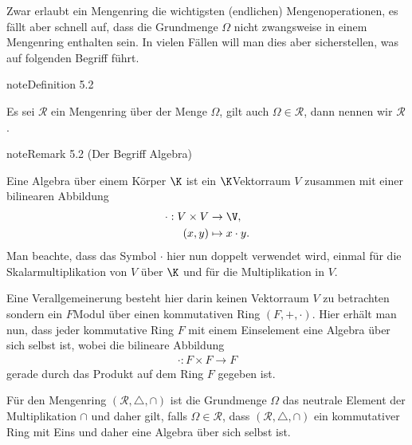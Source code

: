 \documentclass[letterpaper,10pt,german]{jupyterBook}
\begin{document}
\sphinxAtStartPar
Zwar erlaubt ein Mengenring die wichtigsten (endlichen) Mengenoperationen, es fällt aber schnell auf, dass die Grundmenge \(\Omega\) nicht zwangsweise in einem Mengenring enthalten sein. In vielen Fällen will man dies aber sicherstellen, was auf folgenden Begriff führt.
\label{masstheorie/masstheorie:definition-3}
\begin{sphinxadmonition}{note}{Definition 5.2}



\sphinxAtStartPar
Es sei \(\mathcal{R}\) ein Mengenring über der Menge \(\Omega\), gilt auch \(\Omega\in\mathcal{R}\), dann nennen wir \(\mathcal{R}\) .
\end{sphinxadmonition}
\label{masstheorie/masstheorie:remark-4}
\begin{sphinxadmonition}{note}{Remark 5.2 (Der Begriff Algebra)}



\sphinxAtStartPar
Eine Algebra über einem Körper \(\K\) ist ein \(\K\)\sphinxhyphen{}Vektorraum \(V\) zusammen mit einer bilinearen Abbildung
\begin{equation*}
\begin{split}\cdot:V\times V&\to \V,\\
(x,y)&\mapsto x\cdot y.\end{split}
\end{equation*}
\sphinxAtStartPar
Man beachte, dass das Symbol \(\cdot\) hier nun doppelt verwendet wird, einmal für die Skalarmultiplikation von \(V\) über \(\K\) und für die Multiplikation in \(V\).

\sphinxAtStartPar
Eine Verallgemeinerung besteht hier darin keinen Vektorraum \(V\) zu betrachten sondern ein \(F\)\sphinxhyphen{}Modul über einen kommutativen Ring \((F,+,\cdot)\). Hier erhält man nun, dass jeder kommutative Ring \(F\) mit einem Einselement eine Algebra über sich selbst ist, wobei die bilineare Abbildung
\begin{equation*}
\begin{split}\cdot:F\times F\to F\end{split}
\end{equation*}
\sphinxAtStartPar
gerade durch das Produkt auf dem Ring \(F\) gegeben ist.

\sphinxAtStartPar
Für den Mengenring \((\mathcal{R},\triangle, \cap)\) ist die Grundmenge \(\Omega\) das neutrale Element der Multiplikation \(\cap\) und daher gilt, falls \(\Omega\in\mathcal{R}\), dass \((\mathcal{R},\triangle, \cap)\) ein kommutativer Ring mit Eins und daher eine Algebra über sich selbst ist.
\end{sphinxadmonition}
\end{document}
